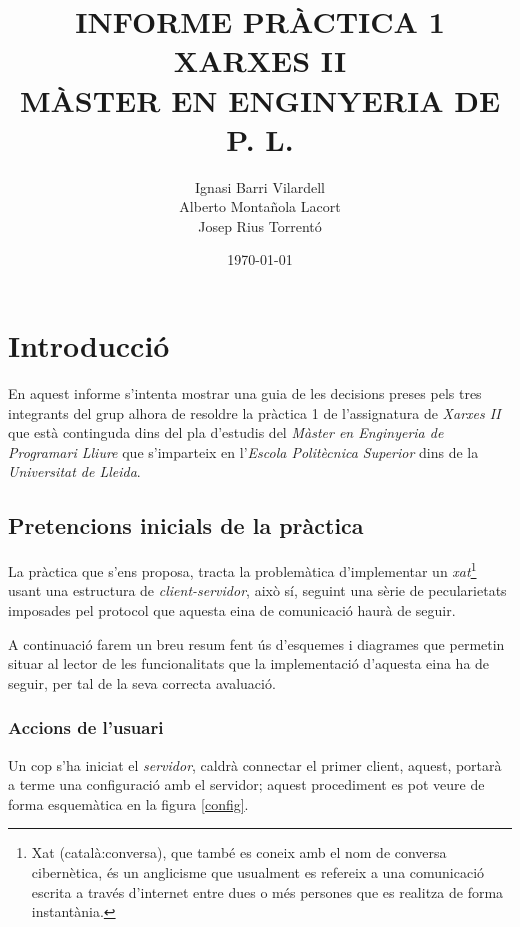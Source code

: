 \documentclass[a4paper,10pt]{article}
\begin{document}
\begin{titlepage}
\title{\bf{INFORME PRÀCTICA 1 \\ XARXES II \\ MÀSTER EN ENGINYERIA DE P. L.}}
\author{Ignasi Barri Vilardell \\ Alberto Montañola Lacort \\ Josep Rius Torrentó}
\date{\today}
\maketitle
\thispagestyle{empty}
\pagebreak
\setcounter{page}{1}
\tableofcontents{}
\listoffigures
\listoftables
\pagebreak
\end{titlepage}

\pagebreak

\section{Introducció}
En aquest informe s'intenta mostrar una guia de les decisions preses pels tres integrants del grup alhora de resoldre la pràctica 1 de l'assignatura de \emph{Xarxes II} que està continguda dins del pla d'estudis del \emph{Màster en Enginyeria de Programari Lliure} que s'imparteix en l'\emph{Escola Politècnica Superior} dins de la \emph{Universitat de Lleida}.

	\subsection{Pretencions inicials de la pràctica}
	La pràctica que s'ens proposa, tracta la problemàtica d'implementar un \emph{xat}\footnote{Xat (català:conversa), que també es coneix amb el nom de conversa cibernètica, és un anglicisme que usualment es refereix a una comunicació escrita a través d'internet entre dues o més persones que es realitza de forma instantània.} usant una estructura de \emph{client-servidor}, això sí, seguint una sèrie de pecularietats imposades pel protocol que aquesta eina de comunicació haurà de seguir.

	A continuació farem un breu resum fent ús d'esquemes i diagrames que permetin situar al lector de les funcionalitats que la implementació d'aquesta eina ha de seguir, per tal de la seva correcta avaluació.

		\subsubsection{Accions de l'usuari}
		Un cop s'ha iniciat el \emph{servidor}, caldrà connectar el primer {client}, aquest, portarà a terme una configuració amb el servidor\label{configuracio}; aquest procediment es pot veure de forma esquemàtica en la figura \ref{config}.
\end{document}
